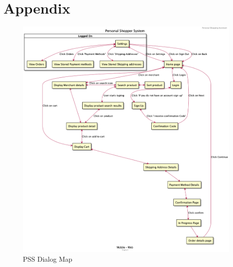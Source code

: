 \section{Appendix}

\begin{figure}[ht]
    \includegraphics[scale=0.32]{../images/pss.png}
    \caption{PSS Dialog Map}
    \label{fig:pss}
\end{figure}

